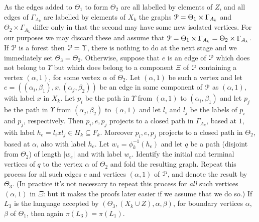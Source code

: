 \documentclass[a4paper,12pt]{article}
\renewcommand{\a}{\alpha }
\renewcommand{\b}{\beta }
\newcommand{\G}{\Gamma }
\newcommand{\T}{\Theta }
\newcommand{\U}{\Upsilon }
\newcommand{\cP}{{\cal{P}}}
\numberwithin{equation}{section}
\numberwithin{figure}{section}
\begin{document}
As the edges added to $\T_1$ to form $\T_2$ are all labelled by elements
of $Z$, and all edges of $\G_{A_k}$ are labelled by elements of $X_k$
the graphs $\cP=\T_1\times \G_{A_k}$ and $\T_2\times \G_{A_k}$ differ only
in that the second may have some new isolated vertices. For our purposes
we may discard these and assume that $\cP=\T_1\times \G_{A_k}=
 \T_2\times \G_{A_k}$. If $\cP$ is a forest then 
$\cP=\U$, there is nothing to do at the
next stage and we immediately set $\T_3=\T_2$. Otherwise, suppose
that $e$ is an edge of $\cP$ which does not belong to $\U$ but
which does belong to a component $\Xi$  of $\cP$ containing a
vertex $(\a,1)$, for some vertex $\a$ of $\T_2$. Let $(\a,1)$ be
such a vertex and let $e=((\a_i,\b_1), x, (\a_j,\b_2))$ be an edge
in same component of $\cP$ as $(\a,1)$,
 with label $x$ in $X_k$.
 Let $p_i$ be
the path in $\U$ from $(\a,1)$ to $(\a_i,\b_1)$ and let $p_j$ be
the path in $\U$ from  $(\a_j,\b_2)$ to $(\a,1)$ and
let $l_i$ and $l_j$ be the labels of $p_i$ and $p_j$, respectively. Then
$p_i,e,p_j$ projects to a closed path in $\G_{A_k}$, based at $1$, with
label $h_e=l_i x l_j \in H_k\subseteq F_k$. Moreover
$p_i,e,p_j$ projects to a closed path in $\T_2$, based at $\a$, also
with label $h_e$. Let
$w_e=\phi_k^{-1}(h_e)$ and let
$q$ be a path (disjoint from $\T_2$) of length
$|w_e|$ and with label $w_e$. Identify the initial and terminal
vertices of $q$ to the vertex  $\a$ of $\Theta_2$ and fold the
resulting graph. Repeat this process for all such edges $e$ and
vertices $(\a,1)$ of $\cP$,
and denote the result by $\T_3$.
(In practice it's not necessary to
repeat this process for {\em all} such vertices $(\a,1)$ in $\Xi$: but it
makes the proofs later easier if we assume that we do so.)
If
$L_3$ is the
language accepted by $(\T_3,(X_k\cup Z), \a,\b)$, for boundary
vertices $\a$, $\b$ of $\T_1$, then again $\pi(L_3)=\pi(L_1)$.
\end{document}
